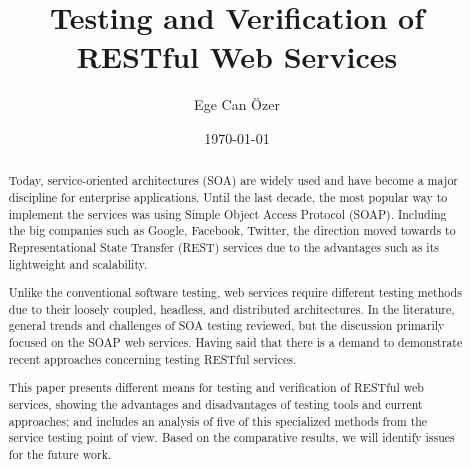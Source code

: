 \documentclass[english]{tktltiki}
\begin{document}
\onehalfspacing

\title{Testing and Verification of RESTful Web Services}
\author{Ege Can Özer}
\date{\today}

\maketitle
{}




\begin{abstract}
\setlength{\parindent}{1cm} %
\setlength{\leftskip}{1cm}
Today, service-oriented architectures (SOA) are widely used and have become a major discipline for enterprise applications. Until the last decade, the most popular way to implement the services was using Simple Object Access Protocol (SOAP). Including the big companies such as Google, Facebook, Twitter, the direction moved towards to Representational State Transfer (REST) services due to the advantages such as its lightweight and scalability.

Unlike the conventional software testing, web services require different testing methods due to their loosely coupled, headless, and distributed architectures. In the literature, general trends and challenges of SOA testing reviewed, but the discussion primarily focused on the SOAP web services. Having said that there is a demand to demonstrate recent approaches concerning testing RESTful services.

This paper presents different means for testing and verification of RESTful web services, showing the advantages and disadvantages of testing tools and current approaches; and includes an analysis of five of this specialized methods from the service testing point of view. Based on the comparative results, we will identify issues for the future work.
\\
\end{abstract}

\mytableofcontents
\end{document}
